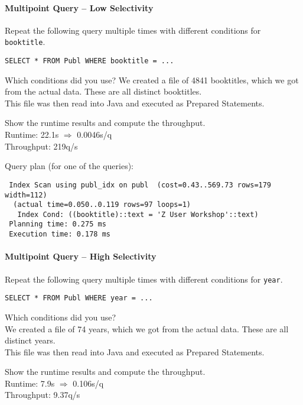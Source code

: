 \documentclass[11pt]{scrartcl}
\begin{document}
\paragraph{Multipoint Query -- Low Selectivity}

Repeat the following query multiple times with different conditions for {\tt booktitle}.

{\small
\begin{verbatim}
SELECT * FROM Publ WHERE booktitle = ...
\end{verbatim}
}

\noindent
Which conditions did you use?
We created a file of 4841 booktitles, which we got from the actual data. These are all distinct booktitles.\\
This file was then read into Java and executed as Prepared Statements.

\smallskip\noindent
Show the runtime results and compute the throughput.\\
Runtime: 22.1s $\Rightarrow$ 0.0046s/q\\
Throughput: 219q/s

\smallskip\noindent
Query plan (for one of the queries):
{\small
\begin{verbatim}
 Index Scan using publ_idx on publ  (cost=0.43..569.73 rows=179 width=112)
  (actual time=0.050..0.119 rows=97 loops=1)
   Index Cond: ((booktitle)::text = 'Z User Workshop'::text)
 Planning time: 0.275 ms
 Execution time: 0.178 ms
\end{verbatim}
}


\paragraph{Multipoint Query -- High Selectivity}

Repeat the following query multiple times with different conditions for {\tt year}.

{\small
\begin{verbatim}
SELECT * FROM Publ WHERE year = ...
\end{verbatim}
}

\noindent
Which conditions did you use?\\
We created a file of 74 years, which we got from the actual data. These are all distinct years.\\
This file was then read into Java and executed as Prepared Statements.

\smallskip\noindent
Show the runtime results and compute the throughput.\\
Runtime: 7.9s $\Rightarrow$ 0.106s/q\\
Throughput: 9.37q/s
\end{document}
